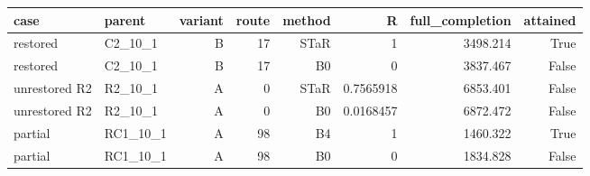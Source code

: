 \begin{tabular}{llrrrrrr}
\hline
case & parent & variant & route & method & R & full\_completion & attained \\
\hline
restored & C2\_10\_1 & B & 17 & STaR & 1 & 3498.214 & True \\
restored & C2\_10\_1 & B & 17 & B0 & 0 & 3837.467 & False \\
unrestored R2 & R2\_10\_1 & A & 0 & STaR & 0.7565918 & 6853.401 & False \\
unrestored R2 & R2\_10\_1 & A & 0 & B0 & 0.0168457 & 6872.472 & False \\
partial & RC1\_10\_1 & A & 98 & B4 & 1 & 1460.322 & True \\
partial & RC1\_10\_1 & A & 98 & B0 & 0 & 1834.828 & False \\
\hline
\end{tabular}
